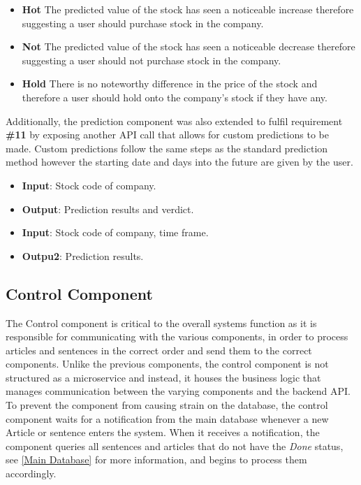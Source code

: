         \begin{itemize}
            \item \textbf{Hot} The predicted value of the stock has seen a noticeable increase therefore suggesting a user should purchase stock in the company.
            \item \textbf{Not} The predicted value of the stock has seen a noticeable decrease therefore suggesting a user should not purchase stock in the company.
            \item \textbf{Hold} There is no noteworthy difference in the price of the stock and therefore a user should hold onto the company's stock if they have any.
        \end{itemize}
        
        Additionally, the prediction component was also extended to fulfil requirement \textbf{\#11} by exposing another API call that allows for custom predictions to be made. Custom predictions follow the same steps as the standard prediction method however the starting date and days into the future are given by the user.
        
        \begin{itemize}
            \item \textbf{Input}: Stock code of company.
            \item \textbf{Output}: Prediction results and verdict.
            \smallskip
            \item \textbf{Input}: Stock code of company, time frame.
            \item \textbf{Outpu2}: Prediction results.
        \end{itemize}
        
        
        \subsection{Control Component}
        \label{Control Component}
        The Control component is critical to the overall systems function as it is responsible for communicating with the various components, in order to process articles and sentences in the correct order and send them to the correct components. Unlike the previous components, the control component is not structured as a microservice and instead, it houses the business logic that manages communication between the varying components and the backend API. To prevent the component from causing strain on the database, the control component waits for a notification from the main database whenever a new Article or sentence enters the system. When it receives a notification, the component queries all sentences and articles that do not have the \textit{Done} status, see \ref{Main Database} for more information, and begins to process them accordingly.
        

